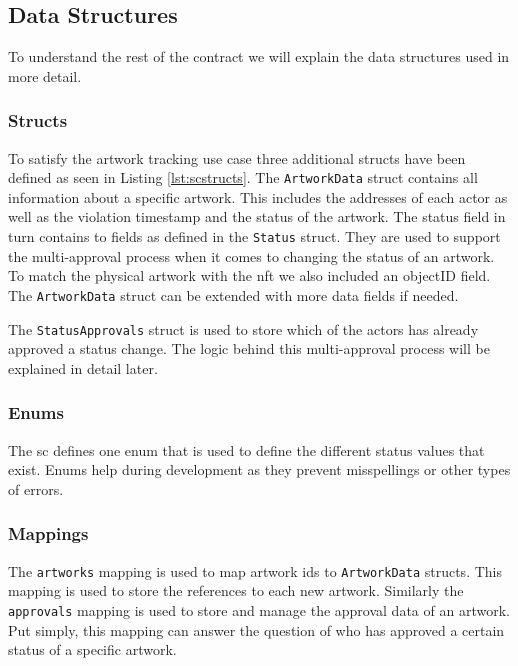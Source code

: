 \subsection{Data Structures}
To understand the rest of the contract we will explain the data structures used in more detail.

\subsubsection{Structs}
To satisfy the artwork tracking use case three additional structs have been defined as seen in Listing \ref{lst:scstructs}. The \texttt{ArtworkData} struct contains all information about a specific artwork. This includes the addresses of each actor as well as the violation timestamp and the status of the artwork. The status field in turn contains to fields as defined in the \texttt{Status} struct. They are used to support the multi-approval process when it comes to changing the status of an artwork. To match the physical artwork with the \gls{nft} we also included an objectID field. The \texttt{ArtworkData} struct can be extended with more data fields if needed.

The \texttt{StatusApprovals} struct is used to store which of the actors has already approved a status change. The logic behind this multi-approval process will be explained in detail later.



\subsubsection{Enums}
The \gls{sc} defines one enum that is used to define the different status values that exist. Enums help during development as they prevent misspellings or other types of errors.



\subsubsection{Mappings}
The \texttt{artworks} mapping is used to map artwork ids to \texttt{ArtworkData} structs. This mapping is used to store the references to each new artwork. Similarly the \texttt{approvals} mapping is used to store and manage the approval data of an artwork. Put simply, this mapping can answer the question of who has approved a certain status of a specific artwork.

